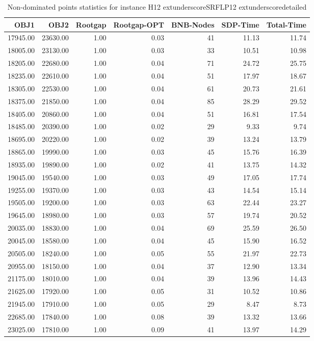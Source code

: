 \begin{table}
\caption{Non-dominated points statistics for instance H12	extunderscoreSRFLP12	extunderscoredetailed}
\label{tab:stats/H12_SRFLP12_detailed}
\begin{tabular}{rrrrrrr}
\toprule
OBJ1 & OBJ2 & Rootgap & Rootgap-OPT & BNB-Nodes & SDP-Time & Total-Time \\
\midrule
17945.00 & 23630.00 & 1.00 & 0.03 & 41 & 11.13 & 11.74 \\
18005.00 & 23130.00 & 1.00 & 0.03 & 33 & 10.51 & 10.98 \\
18205.00 & 22680.00 & 1.00 & 0.04 & 71 & 24.72 & 25.75 \\
18235.00 & 22610.00 & 1.00 & 0.04 & 51 & 17.97 & 18.67 \\
18305.00 & 22530.00 & 1.00 & 0.04 & 61 & 20.73 & 21.61 \\
18375.00 & 21850.00 & 1.00 & 0.04 & 85 & 28.29 & 29.52 \\
18405.00 & 20860.00 & 1.00 & 0.04 & 51 & 16.81 & 17.54 \\
18485.00 & 20390.00 & 1.00 & 0.02 & 29 & 9.33 & 9.74 \\
18695.00 & 20220.00 & 1.00 & 0.02 & 39 & 13.24 & 13.79 \\
18865.00 & 19990.00 & 1.00 & 0.03 & 45 & 15.76 & 16.39 \\
18935.00 & 19890.00 & 1.00 & 0.02 & 41 & 13.75 & 14.32 \\
19045.00 & 19540.00 & 1.00 & 0.03 & 49 & 17.05 & 17.74 \\
19255.00 & 19370.00 & 1.00 & 0.03 & 43 & 14.54 & 15.14 \\
19505.00 & 19200.00 & 1.00 & 0.03 & 63 & 22.44 & 23.27 \\
19645.00 & 18980.00 & 1.00 & 0.03 & 57 & 19.74 & 20.52 \\
20035.00 & 18830.00 & 1.00 & 0.04 & 69 & 25.59 & 26.50 \\
20045.00 & 18580.00 & 1.00 & 0.04 & 45 & 15.90 & 16.52 \\
20505.00 & 18240.00 & 1.00 & 0.05 & 55 & 21.97 & 22.73 \\
20955.00 & 18150.00 & 1.00 & 0.04 & 37 & 12.90 & 13.34 \\
21175.00 & 18010.00 & 1.00 & 0.04 & 39 & 13.96 & 14.43 \\
21625.00 & 17920.00 & 1.00 & 0.05 & 31 & 10.52 & 10.86 \\
21945.00 & 17910.00 & 1.00 & 0.05 & 29 & 8.47 & 8.73 \\
22685.00 & 17840.00 & 1.00 & 0.08 & 39 & 13.32 & 13.66 \\
23025.00 & 17810.00 & 1.00 & 0.09 & 41 & 13.97 & 14.29 \\
\bottomrule
\end{tabular}
\end{table}
